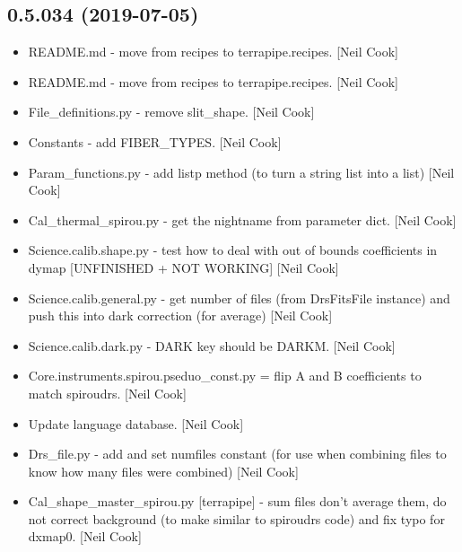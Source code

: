 \documentclass[a4paper,10pt,english]{report}
\begin{document}
\subsection{0.5.034 (2019-07-05)}
\label{\detokenize{misc/changelog:id104}}\begin{itemize}
\item {} 
README.md - move from recipes to terrapipe.recipes. {[}Neil Cook{]}

\item {} 
README.md - move from recipes to terrapipe.recipes. {[}Neil Cook{]}

\item {} 
File\_definitions.py - remove slit\_shape. {[}Neil Cook{]}

\item {} 
Constants - add FIBER\_TYPES. {[}Neil Cook{]}

\item {} 
Param\_functions.py - add listp method (to turn a string list into a
list) {[}Neil Cook{]}

\item {} 
Cal\_thermal\_spirou.py - get the nightname from parameter dict. {[}Neil
Cook{]}

\item {} 
Science.calib.shape.py - test how to deal with out of bounds
coefficients in dymap {[}UNFINISHED + NOT WORKING{]} {[}Neil Cook{]}

\item {} 
Science.calib.general.py - get number of files (from DrsFitsFile
instance) and push this into dark correction (for average) {[}Neil Cook{]}

\item {} 
Science.calib.dark.py - DARK key should be DARKM. {[}Neil Cook{]}

\item {} 
Core.instruments.spirou.pseduo\_const.py = flip A and B coefficients to
match spiroudrs. {[}Neil Cook{]}

\item {} 
Update language database. {[}Neil Cook{]}

\item {} 
Drs\_file.py - add and set numfiles constant (for use when combining
files to know how many files were combined) {[}Neil Cook{]}

\item {} 
Cal\_shape\_master\_spirou.py {[}terrapipe{]} - sum files don’t average them,
do not correct background (to make similar to spiroudrs code) and fix
typo for dxmap0. {[}Neil Cook{]}


\end{itemize}
\end{document}
